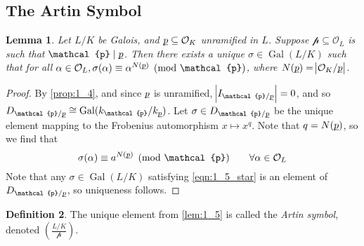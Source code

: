 \documentclass[11pt]{article}
\theoremstyle{definition}
\newtheorem{definition}{Definition}[section]
\theoremstyle{plain}
\newtheorem{lemma}[definition]{Lemma}
\theoremstyle{remark}
\DeclareMathOperator{\Gal}{Gal}
\newcommand{\cO}{\mathcal{O}}
\newcommand{\cp}{\mathcal{p}}
\newcommand{\up}{{\underline{\smash{p}}}}
\newcommand{\leg}[2]{\left(\frac{#1}{#2}\right)}
\begin{document}
\subsection{The Artin Symbol}

\begin{lemma}\label{lem:1_5}
    Let $L/K$ be Galois, and $\up \subseteq \cO_K$ unramified in $L$. Suppose $\cp \subseteq \cO_L$ is such that $\cp \mid \up$. Then there exists a unique $\sigma \in \Gal(L/K)$ such that for all $\alpha \in \cO_L, \sigma(\alpha) \equiv \alpha^{N(\up)} \pmod{\cp}$, where $N(\up) = \abs{\cO_K / \up}$.
\end{lemma}
\begin{proof}
    By \autoref{prop:1_4}, and since $\up$ is unramified, $\abs{I_{\cp / \up}} = 0$, and so $D_{\cp / \up} \cong \Gal(k_\cp / k_\up)$. Let $\sigma \in D_{\cp / \up}$ be the unique element mapping to the Frobenius automorphism $x \mapsto x^q$. Note that $q = N(\up)$, so we find that
    \begin{equation}\label{eqn:1_5_star}
        \sigma(\alpha) \equiv a^{N(\up)} \pmod{\cp} \qquad \forall \alpha \in \cO_L
    \end{equation}
    Note that any $\sigma \in \Gal(L/K)$ satisfying \eqref{eqn:1_5_star} is an element of $D_{\cp / \up}$, so uniqueness follows.
\end{proof}

\begin{definition}\label{def:1_6}
    The unique element from \autoref{lem:1_5} is called the \emph{Artin symbol}, denoted $\leg{L/K}{\cp}$.
\end{definition}
\end{document}
